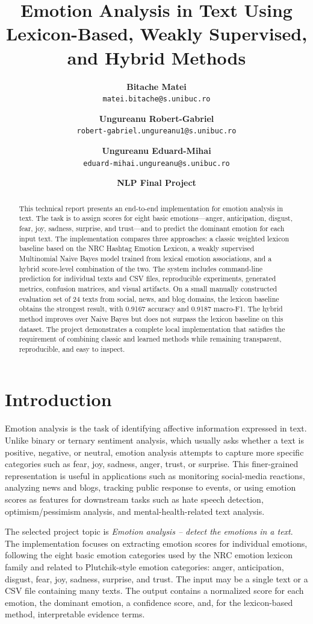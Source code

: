\documentclass[11pt]{article}
\title{Emotion Analysis in Text Using Lexicon-Based, Weakly Supervised, and Hybrid Methods}
\author{
    \textbf{Bitache Matei} \\
    \small \texttt{matei.bitache@s.unibuc.ro}
    \and
    \textbf{Ungureanu Robert-Gabriel} \\
    \small \texttt{robert-gabriel.ungureanu1@s.unibuc.ro}
    \and
    \textbf{Ungureanu Eduard-Mihai} \\
    \small \texttt{eduard-mihai.ungureanu@s.unibuc.ro}
}
\date{\textbf{NLP Final Project}}
\date{}
\begin{document}
\maketitle

\begin{abstract}
This technical report presents an end-to-end implementation for emotion analysis in text. The task is to assign scores for eight basic emotions---anger, anticipation, disgust, fear, joy, sadness, surprise, and trust---and to predict the dominant emotion for each input text. The implementation compares three approaches: a classic weighted lexicon baseline based on the NRC Hashtag Emotion Lexicon, a weakly supervised Multinomial Naive Bayes model trained from lexical emotion associations, and a hybrid score-level combination of the two. The system includes command-line prediction for individual texts and CSV files, reproducible experiments, generated metrics, confusion matrices, and visual artifacts. On a small manually constructed evaluation set of 24 texts from social, news, and blog domains, the lexicon baseline obtains the strongest result, with 0.9167 accuracy and 0.9187 macro-F1. The hybrid method improves over Naive Bayes but does not surpass the lexicon baseline on this dataset. The project demonstrates a complete local implementation that satisfies the requirement of combining classic and learned methods while remaining transparent, reproducible, and easy to inspect.
\end{abstract}

\section{Introduction}

Emotion analysis is the task of identifying affective information expressed in text. Unlike binary or ternary sentiment analysis, which usually asks whether a text is positive, negative, or neutral, emotion analysis attempts to capture more specific categories such as fear, joy, sadness, anger, trust, or surprise. This finer-grained representation is useful in applications such as monitoring social-media reactions, analyzing news and blogs, tracking public response to events, or using emotion scores as features for downstream tasks such as hate speech detection, optimism/pessimism analysis, and mental-health-related text analysis.

The selected project topic is \textit{Emotion analysis -- detect the emotions in a text}. The implementation focuses on extracting emotion scores for individual emotions, following the eight basic emotion categories used by the NRC emotion lexicon family and related to Plutchik-style emotion categories: anger, anticipation, disgust, fear, joy, sadness, surprise, and trust. The input may be a single text or a CSV file containing many texts. The output contains a normalized score for each emotion, the dominant emotion, a confidence score, and, for the lexicon-based method, interpretable evidence terms.
\end{document}
